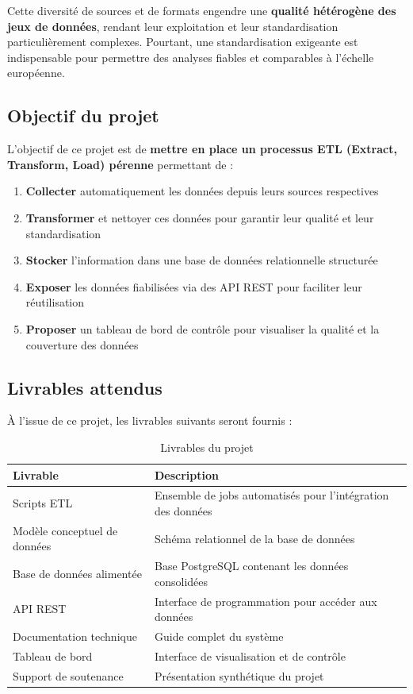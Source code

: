 \documentclass[12pt,a4paper]{article}
\begin{document}
Cette diversité de sources et de formats engendre une \textbf{qualité hétérogène des jeux de données}, rendant leur exploitation et leur standardisation particulièrement complexes. Pourtant, une standardisation exigeante est indispensable pour permettre des analyses fiables et comparables à l'échelle européenne.

\subsection{Objectif du projet}

L'objectif de ce projet est de \textbf{mettre en place un processus ETL (Extract, Transform, Load) pérenne} permettant de :

\begin{enumerate}
    \item \textbf{Collecter} automatiquement les données depuis leurs sources respectives
    \item \textbf{Transformer} et nettoyer ces données pour garantir leur qualité et leur standardisation
    \item \textbf{Stocker} l'information dans une base de données relationnelle structurée
    \item \textbf{Exposer} les données fiabilisées via des API REST pour faciliter leur réutilisation
    \item \textbf{Proposer} un tableau de bord de contrôle pour visualiser la qualité et la couverture des données
\end{enumerate}

\subsection{Livrables attendus}

À l'issue de ce projet, les livrables suivants seront fournis :

\begin{table}[h!]
\centering
\begin{tabular}{|p{5cm}|p{8cm}|}
\hline
\textbf{Livrable} & \textbf{Description} \\
\hline
Scripts ETL & Ensemble de jobs automatisés pour l'intégration des données \\
\hline
Modèle conceptuel de données & Schéma relationnel de la base de données \\
\hline
Base de données alimentée & Base PostgreSQL contenant les données consolidées \\
\hline
API REST & Interface de programmation pour accéder aux données \\
\hline
Documentation technique & Guide complet du système \\
\hline
Tableau de bord & Interface de visualisation et de contrôle \\
\hline
Support de soutenance & Présentation synthétique du projet \\
\hline
\end{tabular}
\caption{Livrables du projet}
\end{table}
\end{document}
